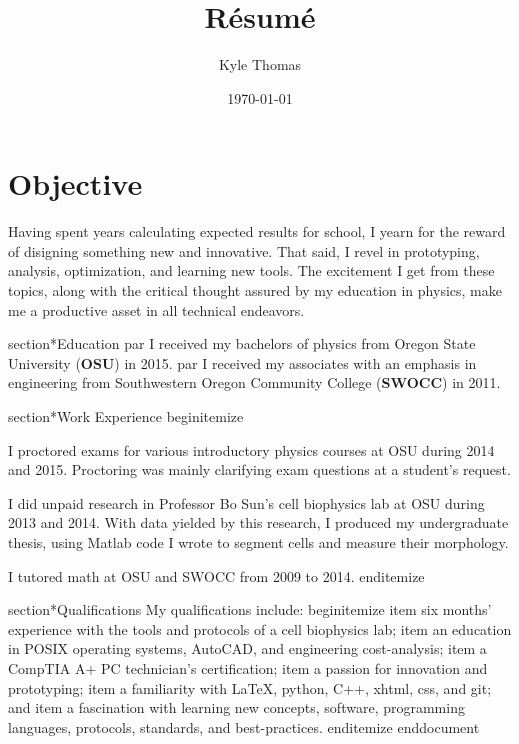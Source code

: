 \documentclass[ notitlepage, prl]{ revtex4-1}
\begin{document}
\author{Kyle Thomas}
\title{R\'esum\'e}
\date{\today}
\maketitle
\section*{Objective}
Having spent years calculating expected results for school, I yearn for the reward of disigning something new and innovative.
That said, I revel in prototyping, analysis, optimization, and learning new tools. The excitement I get from these topics, along with the critical thought assured by my education in physics, make me a productive asset in all technical endeavors.

section*{Education}
par I received my bachelors of physics from Oregon State University (\textbf {OSU}) in 2015.
par I received my associates with an emphasis in engineering from Southwestern Oregon Community College (\textbf {SWOCC}) in 2011.

section*{Work Experience}
begin{itemize}
\item I proctored exams for various introductory physics courses at OSU during 2014 and 2015.
Proctoring was mainly clarifying exam questions at a student's request.
\item I did unpaid research in Professor Bo Sun's cell biophysics lab at OSU during 2013 and 2014.
With data yielded by this research, I produced my undergraduate thesis, using Matlab code I wrote to segment cells and measure their morphology.
\item I tutored math at OSU and SWOCC from 2009 to 2014.
end{itemize}

section*{Qualifications}
My qualifications include:
begin{itemize}
item six months' experience with the tools and protocols of a cell biophysics lab;
item an education in POSIX operating systems, AutoCAD, and engineering cost-analysis;
item a CompTIA A+ PC technician's certification;
item a passion for innovation and prototyping;
item a familiarity with \LaTeX, python, C++, xhtml, css, and git; and
item a fascination with learning new concepts, software, programming languages, protocols, standards, and best-practices.
end{itemize}
end{document}
\end{document}
